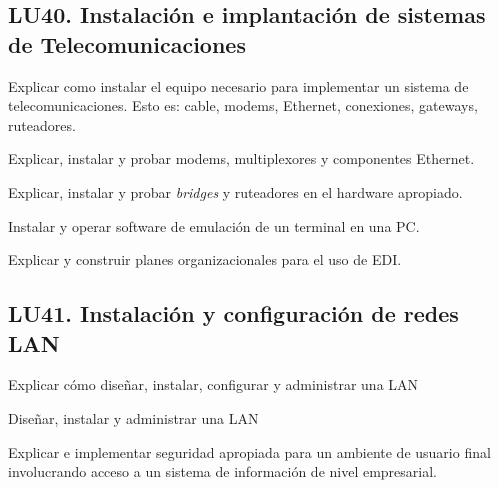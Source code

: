 \subsection{LU40. Instalación e implantación de sistemas de Telecomunicaciones}\label{sec:BOK-LU40}\label{sec:LU40}
\begin{LearningUnit}
\begin{LUGoal}
\item Explicar como instalar el equipo necesario para implementar un sistema de telecomunicaciones. Esto es: cable, modems, Ethernet, conexiones, gateways, ruteadores.
\end{LUGoal}

\begin{LUObjective}
\item Explicar, instalar y probar modems, multiplexores y componentes Ethernet.
\item Explicar, instalar y probar \textit{bridges} y ruteadores en el hardware apropiado.
\item Instalar y operar software de emulación de un terminal en una PC.
\item Explicar y construir planes organizacionales para el uso de EDI.
\end{LUObjective}
\end{LearningUnit}

\subsection{LU41. Instalación y configuración de redes LAN}\label{sec:BOK-LU41}\label{sec:LU41}
\begin{LearningUnit}
\begin{LUGoal}
\item Explicar cómo diseñar, instalar, configurar y administrar una LAN
\end{LUGoal}

\begin{LUObjective}
\item Diseñar, instalar y administrar una LAN
\item Explicar e implementar seguridad apropiada para un ambiente de usuario final involucrando acceso a un sistema de información de nivel empresarial.
\end{LUObjective}
\end{LearningUnit}


